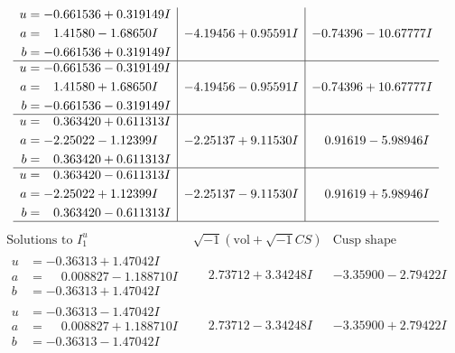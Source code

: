 \documentclass[1p]{elsarticle_modified}
\theoremstyle{definition}
\newcommand{\I}{\sqrt{-1}}
\begin{document}
$$\begin{array}{c|c|c}
\begin{aligned}
u &= -0.661536 + 0.319149 I \\
a &= \phantom{-}1.41580 - 1.68650 I \\
b &= -0.661536 + 0.319149 I\end{aligned}
 & -4.19456 + 0.95591 I & -0.74396 - 10.67777 I \\ \hline\begin{aligned}
u &= -0.661536 - 0.319149 I \\
a &= \phantom{-}1.41580 + 1.68650 I \\
b &= -0.661536 - 0.319149 I\end{aligned}
 & -4.19456 - 0.95591 I & -0.74396 + 10.67777 I \\ \hline\begin{aligned}
u &= \phantom{-}0.363420 + 0.611313 I \\
a &= -2.25022 - 1.12399 I \\
b &= \phantom{-}0.363420 + 0.611313 I\end{aligned}
 & -2.25137 + 9.11530 I & \phantom{-}0.91619 - 5.98946 I \\ \hline\begin{aligned}
u &= \phantom{-}0.363420 - 0.611313 I \\
a &= -2.25022 + 1.12399 I \\
b &= \phantom{-}0.363420 - 0.611313 I\end{aligned}
 & -2.25137 - 9.11530 I & \phantom{-}0.91619 + 5.98946 I\\
 \hline 
 \end{array}$$\newpage$$\begin{array}{c|c|c}  
\text{Solutions to }I^u_{1}& \I (\text{vol} + \sqrt{-1}CS) & \text{Cusp shape}\\
 \hline 
\begin{aligned}
u &= -0.36313 + 1.47042 I \\
a &= \phantom{-}0.008827 - 1.188710 I \\
b &= -0.36313 + 1.47042 I\end{aligned}
 & \phantom{-}2.73712 + 3.34248 I & -3.35900 - 2.79422 I \\ \hline\begin{aligned}
u &= -0.36313 - 1.47042 I \\
a &= \phantom{-}0.008827 + 1.188710 I \\
b &= -0.36313 - 1.47042 I\end{aligned}
 & \phantom{-}2.73712 - 3.34248 I & -3.35900 + 2.79422 I \\ \hline\begin{aligned}

\end{aligned}
\end{array}$$
\end{document}
